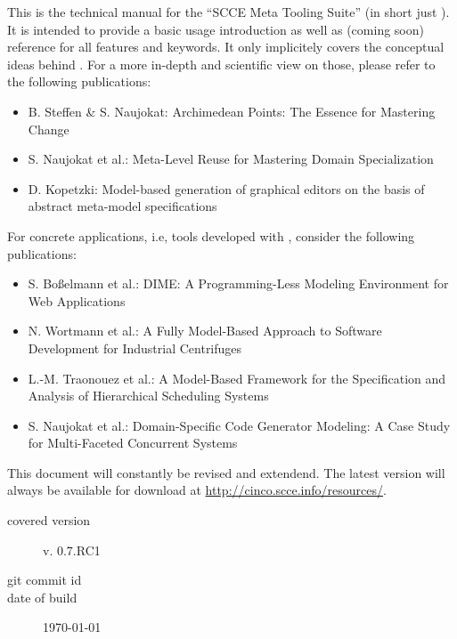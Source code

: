 \documentclass[a4paper,american,12pt]{scrreprt}
\begin{document}
This is the technical manual for the ``\cinco SCCE Meta Tooling Suite'' (in
short just \cinco). It is intended to provide a basic usage introduction as
well as (coming soon\texttrademark{}) reference for all features and keywords. It only implicitely covers the
conceptual ideas behind \cinco. For a more in-depth and scientific view on those,
please refer to the following publications:
%
\begin{itemize}
\item B. Steffen \& S. Naujokat: Archimedean Points: The Essence for Mastering Change~\cite{SteNau2016}
\item S. Naujokat et al.: Meta-Level Reuse for Mastering Domain Specialization~\cite{NaNeMS2016}
\item D. Kopetzki: Model-based generation of graphical editors on the basis of abstract meta-model specifications~\cite{Kopetz2014}
\end{itemize}
%
For concrete applications, i.e, tools developed with \cinco{}, consider the following publications:
\begin{itemize}
\item S. Boßelmann et al.: DIME: A Programming-Less Modeling Environment for Web Applications~\cite{BFKLNN2016}
\item N. Wortmann et al.: A Fully Model-Based Approach to Software Development for Industrial Centrifuges~\cite{WoMiNa2016}
\item L.-M. Traonouez et al.: A Model-Based Framework for the Specification and Analysis of Hierarchical Scheduling Systems~\cite{TLKCSN2016}
\item S. Naujokat et al.: Domain-Specific Code Generator Modeling: A Case Study for Multi-Faceted Concurrent Systems~\cite{NaTISL2014}
\end{itemize}

This document will constantly be revised and extendend. The latest version will
always be available for download at \url{http://cinco.scce.info/resources/}. 

\begin{description}
\item[covered version] \cinco v. 0.7.RC1
\item[git commit id] \gitAbbrevHash{}
\item[date of build] \today
\end{description}
\end{document}
